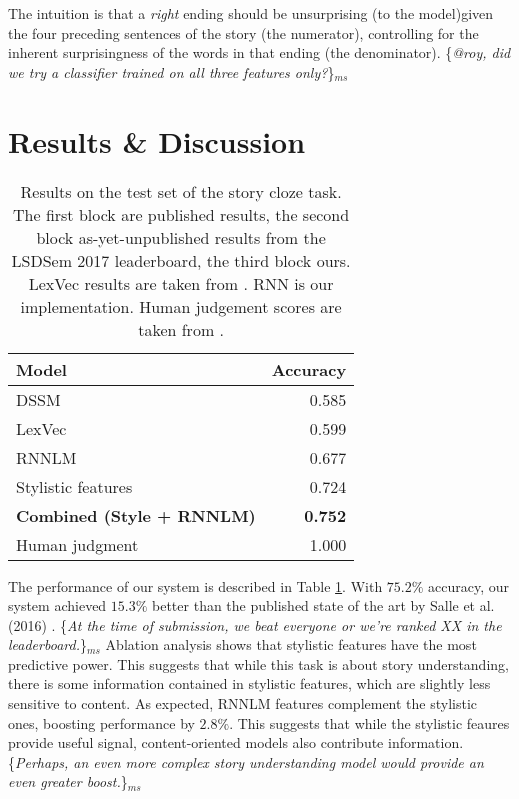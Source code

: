 \documentclass[11pt]{article}
\newcommand{\ms}[1]{{\color{cyan}\{\textit{#1}\}$_{ms}$}}
\begin{document}
The intuition is that a \emph{right} ending should be unsurprising (to the model)given the four preceding sentences of the story (the numerator), controlling for the inherent surprisingness of the words in that ending (the denominator). \ms{@roy, did we try a classifier trained on all three features only?}

\section{Results \& Discussion}

\begin{table}%
\begin{center}
\begin{tabular}{|l|r|} \hline
{\bf Model} & {\bf Accuracy} \\ \hline
{DSSM} \cite{Mostafazadeh:2016} & 0.585 \\ 
{LexVec} \cite{Salle:2016} & 0.599 \\ \hline\hline
{RNNLM}		& 0.677 \\ 
{Stylistic features} & {0.724} \\ 
{\bf Combined (Style + RNNLM)} & {\bf 0.752} \\ \hline\hline
Human judgment & 1.000 \\ \hline
\end{tabular}
\end{center}
\caption{\label{cloze_results}
Results on the test set of the  story cloze task. 
The first block are published results, the second block
as-yet-unpublished results from the LSDSem 2017 leaderboard, the third
block ours.
LexVec results are taken from \cite{Speer:2016}.
RNN is our implementation. 
Human judgement scores are taken from \cite{Mostafazadeh:2016}. 
}
\end{table}

The performance of our system is described in Table \ref{cloze_results}. With $75.2\%$ accuracy, our system achieved $15.3\%$ better than the published state of the art by Salle et al. (2016) \nocite{Salle:2016}. 
\ms{At the time of submission, we beat everyone or we're ranked XX in the leaderboard.}
Ablation analysis shows that stylistic features have the most predictive power.
This suggests that while this task is about story understanding, there is some information contained in stylistic features, which are slightly less sensitive to content.
As expected, RNNLM features complement the stylistic ones, boosting performance by $2.8\%$. This suggests that while the stylistic feaures provide useful signal, content-oriented models also contribute information. 
\ms{Perhaps, an even more complex story understanding model would provide an even greater boost.}
\end{document}
